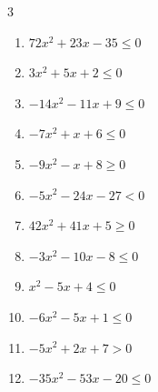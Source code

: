 \begin{multicols}{3}
\begin{enumerate}

  \item $72x^{2}+23x-35\leq 0$


  \item $3x^{2}+5x+2\leq 0$


  \item $-14x^{2}-11x+9\leq 0$


  \item $-7x^{2}+x+6\leq 0$


  \item $-9x^{2}-x+8\geq 0$


\columnbreak %

  \item $-5x^{2}-24x-27<0$


  \item $42x^{2}+41x+5\geq 0$


  \item $-3x^{2}-10x-8\leq 0$


  \item $x^{2}-5x+4\leq 0$

        \phantom{$\displaystyle 1 \leqq x \leqq 4$}

  \item $-6x^{2}-5x+1\leq 0$


  \item $-5x^{2}+2x+7>0$


  \item $-35x^{2}-53x-20\leq 0$


\end{enumerate}
\end{multicols}

